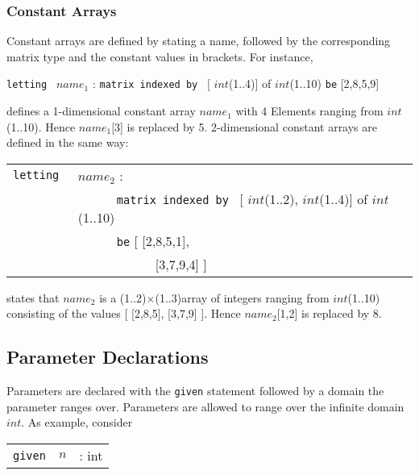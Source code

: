 \documentclass{article}
\begin{document}
\subsubsection{Constant Arrays}
Constant arrays are defined by stating a name, followed by 
the corresponding matrix type and the constant values in brackets.
For instance,
\begin{center}
{\tt letting }   $name_1$ :  {\tt matrix indexed by } [ $int$(1..4)] of $int$(1..10)  {\tt be}   [2,8,5,9]\\
\end{center}
defines a 1-dimensional constant array $name_1$ with 4 Elements
ranging from $int$(1..10). Hence  $name_1$[3] is replaced by 5.
2-dimensional constant arrays are defined in the same way:
\begin{center}
\begin{tabular}{ll}
{\tt letting }&  $name_2$ : \\
      &\ \ \ \ \ \  {\tt matrix indexed by } [ $int$(1..2), $int$(1..4)] of $int$(1..10) \\
 & \ \ \ \ \ \   {\tt be}  [ [2,8,5,1], \\
 & \ \ \ \ \ \ \ \ \ \ \ \ [3,7,9,4] ]   \\
\end{tabular}
\end{center}
states that $name_2$ is a (1..2)$\times$(1..3)array of integers ranging from
$int$(1..10) consisting of the values [ [2,8,5], [3,7,9] ]. Hence
$name_2$[1,2] is replaced by 8. 




\subsection{Parameter Declarations}
Parameters are declared with the {\tt given} statement followed 
by a domain the parameter ranges over. Parameters are allowed to 
range over the infinite domain $int$. As example, consider
\begin{center}
\begin{tabular}{lll}
{\tt given} & $n$ & : int \\
\end{tabular}
\end{center}
\end{document}
